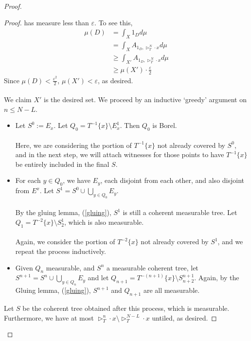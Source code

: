 \documentclass{article}
\let\oldref\ref
\renewcommand{\ref}[1]{(\oldref{#1})}
\theoremstyle{definition}
\begin{document}
\begin{proof}
\begin{proof}
        has measure less than $ \varepsilon $. To see this, 
        \begin{align*}
            \mu(D) &= \int_X 1_{D} d\mu\\
            &= \int_X A_{1_{D},\triangleright^N_T\cdot x}d\mu\\
            &\geq \int_{X'} A_{1_{D},\triangleright^N_T\cdot x} d\mu \\
            &\geq \mu(X')\cdot \frac{\varepsilon}{2}
        \end{align*}
        Since $ \mu(D) <\frac{\varepsilon^2}{2} $, $ \mu(X') < \varepsilon $, as desired.\\\\
        We claim $ X' $ is the desired set. We proceed by an inductive `greedy' argument on $ n\leq N-L $. 
        \begin{itemize}
            \item Let $ S^0:= E_x $. Let $ Q_0 = T^{-1}\{x\}\setminus E_x^1 $. Then $ Q_0 $ is Borel. \\\\
            Here, we are considering the portion of $ T^{-1}\{x\} $ not already covered by $ S^0 $, and in the next step, we will attach witnesses for those points to have $ T^{-1}\{x\}$ be entirely included in the final $ S $.
            \item For each $ y \in Q_0 $, we have $ E_y $, each disjoint from each other, and also disjoint from $ E^x $. Let $ S^1 = S^0\cup \bigcup_{y\in Q_0}E_y $. \\\\
            By the gluing lemma, \ref{gluing}, $ S^1 $ is still a coherent measurable tree. Let $ Q_1 = T^{-2}\{x\}\setminus S^1_2 $, which is also measurable.\\\\
            Again, we consider the portion of $ T^{-2}\{x\} $ not already covered by $ S^1 $, and we repeat the process inductively.
            \item Given $ Q_n $ measurable, and $ S^n $ a measurable coherent tree, let $ S^{n+1} = S^n\cup \bigcup_{y\in Q_n}E_y $ and let $ Q_{n+1} = T^{-(n+1)}\{x\}\setminus S^{n+1}_{n+2} $. Again, by the Gluing lemma, \ref{gluing}, $ S^{n+1} $ and $ Q_{n+1} $ are all measurable.
        \end{itemize}
        Let $ S $ be the coherent tree obtained after this process, which is measurable. Furthermore, we have at most $ \triangleright^n_T\cdot x\setminus \triangleright_T^{N-L}\cdot x $ untiled, as desired.

\end{proof}
\end{proof}
\end{document}
